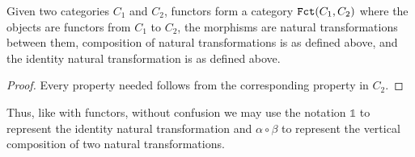 \documentclass[../math.tex]{subfiles}
\begin{document}
\begin{theorem}
    Given two categories $C_1$ and $C_2$, functors form a category $\Fct(C_1,
    C_2)$ where the objects are functors from $C_1$ to $C_2$, the morphisms are
    natural transformations between them, composition of natural transformations
    is as defined above, and the identity natural transformation is as defined
    above.
\end{theorem}
\begin{proof}
    Every property needed follows from the corresponding property in $C_2$.
\end{proof}

Thus, like with functors, without confusion we may use the notation $\mathds 1$
to represent the identity natural transformation and $\alpha \circ \beta$ to
represent the vertical composition of two natural transformations.
\end{document}
